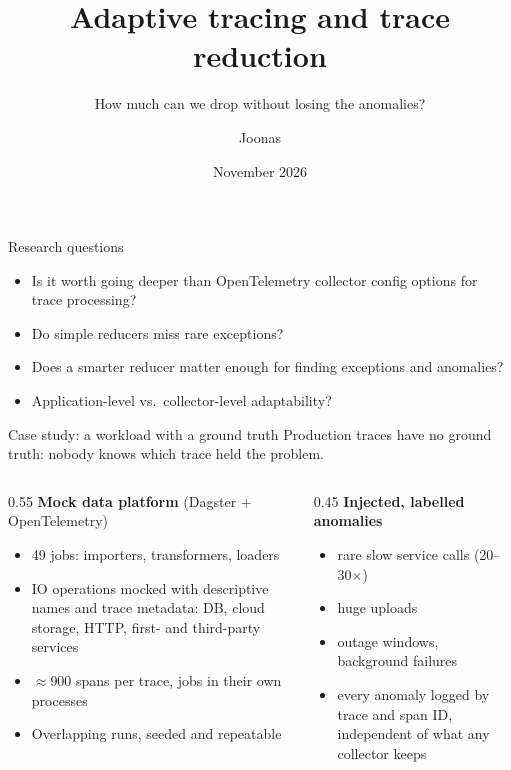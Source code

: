 \documentclass[aspectratio=169,11pt]{beamer}
\title{Adaptive tracing and trace reduction}
\subtitle{How much can we drop without losing the anomalies?}
\author{Joonas}
\institute{CS-E4660 course project}
\date{November 2026}
\begin{document}
\begin{frame}
  \titlepage
\end{frame}

\begin{frame}{Research questions}
  \begin{itemize}
    \item Is it worth going deeper than OpenTelemetry collector config options for trace processing?
    \item Do simple reducers miss rare exceptions?
    \item Does a smarter reducer matter enough for finding exceptions and anomalies?
    \item Application-level vs.\ collector-level adaptability?
  \end{itemize}
\end{frame}

\begin{frame}{Case study: a workload with a ground truth}
  Production traces have no ground truth: nobody knows which trace held the problem.
  \medskip

  \begin{columns}[T]
    \begin{column}{0.55\textwidth}
      \textbf{Mock data platform} (Dagster + OpenTelemetry)
      \begin{itemize}
        \item 49 jobs: importers, transformers, loaders
        \item IO operations mocked with descriptive names and trace metadata: DB, cloud storage, HTTP, first- and third-party services
        \item $\approx$900 spans per trace, jobs in their own processes
        \item Overlapping runs, seeded and repeatable
      \end{itemize}
    \end{column}
    \begin{column}{0.45\textwidth}
      \textbf{Injected, labelled anomalies}
      \begin{itemize}
        \item rare slow service calls (20--30$\times$)
        \item huge uploads
        \item outage windows, background failures
        \item every anomaly logged by trace and span ID, independent of what any collector keeps
      \end{itemize}
    \end{column}
  \end{columns}
\end{frame}
\end{document}
